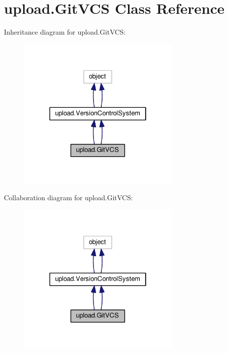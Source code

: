 \hypertarget{classupload_1_1_git_v_c_s}{}\section{upload.\+Git\+V\+CS Class Reference}
\label{classupload_1_1_git_v_c_s}


Inheritance diagram for upload.\+Git\+V\+CS\+:
\nopagebreak
\begin{figure}[H]
\begin{center}
\leavevmode
\includegraphics[width=226pt]{classupload_1_1_git_v_c_s__inherit__graph}
\end{center}
\end{figure}


Collaboration diagram for upload.\+Git\+V\+CS\+:
\nopagebreak
\begin{figure}[H]
\begin{center}
\leavevmode
\includegraphics[width=226pt]{classupload_1_1_git_v_c_s__coll__graph}
\end{center}
\end{figure}
